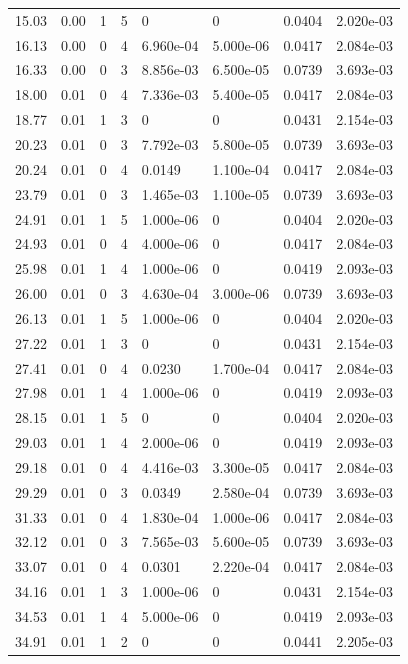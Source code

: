 \documentclass[preview]{standalone}
\begin{document}
{{\begin{tabular}{L{1.2cm}C{1.2cm} C{0.3cm}C{0.5cm} C{1.4cm}C{1.4cm} C{1.4cm}C{1.4cm}}
  15.03  &  0.00  & 1     &  5 &  0  & 0  & 0.0404 &  2.020e-03   \\ 
  16.13  &  0.00  & 0     &  4 &  6.960e-04  & 5.000e-06  & 0.0417 &  2.084e-03   \\ 
  16.33  &  0.00  & 0     &  3 &  8.856e-03  & 6.500e-05  & 0.0739 &  3.693e-03   \\ 
  18.00  &  0.01  & 0     &  4 &  7.336e-03  & 5.400e-05  & 0.0417 &  2.084e-03   \\ 
  18.77  &  0.01  & 1     &  3 &  0  & 0  & 0.0431 &  2.154e-03   \\ 
  20.23  &  0.01  & 0     &  3 &  7.792e-03  & 5.800e-05  & 0.0739 &  3.693e-03   \\ 
  20.24  &  0.01  & 0     &  4 &  0.0149  & 1.100e-04  & 0.0417 &  2.084e-03   \\ 
  23.79  &  0.01  & 0     &  3 &  1.465e-03  & 1.100e-05  & 0.0739 &  3.693e-03   \\ 
  24.91  &  0.01  & 1     &  5 &  1.000e-06  & 0  & 0.0404 &  2.020e-03   \\ 
  24.93  &  0.01  & 0     &  4 &  4.000e-06  & 0  & 0.0417 &  2.084e-03   \\ 
  25.98  &  0.01  & 1     &  4 &  1.000e-06  & 0  & 0.0419 &  2.093e-03   \\ 
  26.00  &  0.01  & 0     &  3 &  4.630e-04  & 3.000e-06  & 0.0739 &  3.693e-03   \\ 
  26.13  &  0.01  & 1     &  5 &  1.000e-06  & 0  & 0.0404 &  2.020e-03   \\ 
  27.22  &  0.01  & 1     &  3 &  0  & 0  & 0.0431 &  2.154e-03   \\ 
  27.41  &  0.01  & 0     &  4 &  0.0230  & 1.700e-04  & 0.0417 &  2.084e-03   \\ 
  27.98  &  0.01  & 1     &  4 &  1.000e-06  & 0  & 0.0419 &  2.093e-03   \\ 
  28.15  &  0.01  & 1     &  5 &  0  & 0  & 0.0404 &  2.020e-03   \\ 
  29.03  &  0.01  & 1     &  4 &  2.000e-06  & 0  & 0.0419 &  2.093e-03   \\ 
  29.18  &  0.01  & 0     &  4 &  4.416e-03  & 3.300e-05  & 0.0417 &  2.084e-03   \\ 
  29.29  &  0.01  & 0     &  3 &  0.0349  & 2.580e-04  & 0.0739 &  3.693e-03   \\ 
  31.33  &  0.01  & 0     &  4 &  1.830e-04  & 1.000e-06  & 0.0417 &  2.084e-03   \\ 
  32.12  &  0.01  & 0     &  3 &  7.565e-03  & 5.600e-05  & 0.0739 &  3.693e-03   \\ 
  33.07  &  0.01  & 0     &  4 &  0.0301  & 2.220e-04  & 0.0417 &  2.084e-03   \\ 
  34.16  &  0.01  & 1     &  3 &  1.000e-06  & 0  & 0.0431 &  2.154e-03   \\ 
  34.53  &  0.01  & 1     &  4 &  5.000e-06  & 0  & 0.0419 &  2.093e-03   \\ 
  34.91  &  0.01  & 1     &  2 &  0  & 0  & 0.0441 &  2.205e-03   \\ 
\hline 
\end{tabular} 

}}
\end{document}
